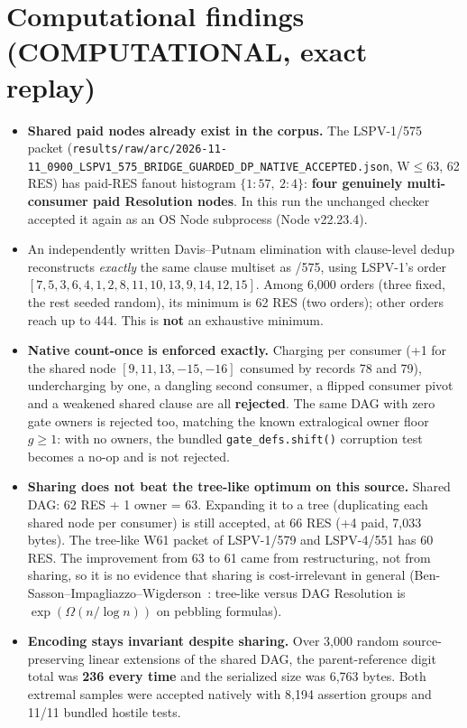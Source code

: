 \documentclass[11pt]{article}
\begin{document}
\section*{Computational findings (COMPUTATIONAL, exact replay)}
\begin{itemize}
\item \textbf{Shared paid nodes already exist in the corpus.} The LSPV-1/575 packet
(\texttt{results/raw/arc/2026-11-11\_0900\_LSPV1\_575\_BRIDGE\_GUARDED\_DP\_NATIVE\_ACCEPTED.json}, W$\le$63, 62 RES)
has paid-RES fanout histogram $\{1{:}57,\ 2{:}4\}$: \textbf{four genuinely multi-consumer paid
Resolution nodes}. In this run the unchanged checker accepted it again as an OS Node subprocess (Node v22.23.4).
\item An independently written Davis--Putnam elimination with clause-level dedup reconstructs
\emph{exactly} the same clause multiset as /575, using LSPV-1's order
$[7,5,3,6,4,1,2,8,11,10,13,9,14,12,15]$. Among 6,000 orders (three fixed, the rest seeded
random), its minimum is 62 RES (two orders); other orders reach up to 444. This is \textbf{not}
an exhaustive minimum.
\item \textbf{Native count-once is enforced exactly.} Charging per consumer (+1 for the shared
node $[9,11,13,-15,-16]$ consumed by records 78 and 79), undercharging by one, a dangling second
consumer, a flipped consumer pivot and a weakened shared clause are all \textbf{rejected}. The
same DAG with zero gate owners is rejected too, matching the known extralogical owner floor $g\ge1$:
with no owners, the bundled \texttt{gate\_defs.shift()} corruption test becomes a no-op and is not rejected.
\item \textbf{Sharing does not beat the tree-like optimum on this source.} Shared DAG: 62 RES + 1
owner = 63. Expanding it to a tree (duplicating each shared node per consumer) is still accepted, at 66
RES (+4 paid, 7,033 bytes). The tree-like W61 packet of LSPV-1/579 and LSPV-4/551 has 60 RES. The improvement from 63 to 61
came from restructuring, not from sharing, so it is no evidence that sharing is cost-irrelevant in general
(Ben-Sasson--Impagliazzo--Wigderson~\cite{BIW}: tree-like versus DAG Resolution is
$\exp(\Omega(n/\log n))$ on pebbling formulas).
\item \textbf{Encoding stays invariant despite sharing.} Over 3,000 random source-preserving linear
extensions of the shared DAG, the parent-reference digit total was \textbf{236 every time} and the serialized
size was 6,763 bytes. Both extremal samples were accepted natively with 8,194 assertion groups and 11/11 bundled hostile tests.
\end{itemize}
\end{document}
